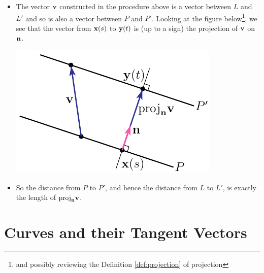 \begin{eg}
\begin{itemize}
\item
The vector $\mathbf{v}$ constructed in the procedure above is a vector between $L$ and $L'$ and so is also a vector between $P$ and $P'$. Looking at the figure
below\footnote{and possibly reviewing the Definition \ref{def:projection}
of projection}, we see that the vector from $\mathbf{x}(s)$ to $\mathbf{y}(t)$ is 
(up to a sign) the projection of $\mathbf{v}$ on $\mathbf{n}$. 
\begin{efig}
\begin{center}
     \includegraphics{planeDistB.pdf}
\end{center}
\end{efig}

\item 
So the distance from $P$ to $P'$, and hence the distance from $L$ to $L'$,
is exactly the length of ${\rm proj}_{\mathbf{n}}\mathbf{v}$.

\end{itemize}




\end{eg}

\section{Curves and their Tangent Vectors}\label{sec curves}


